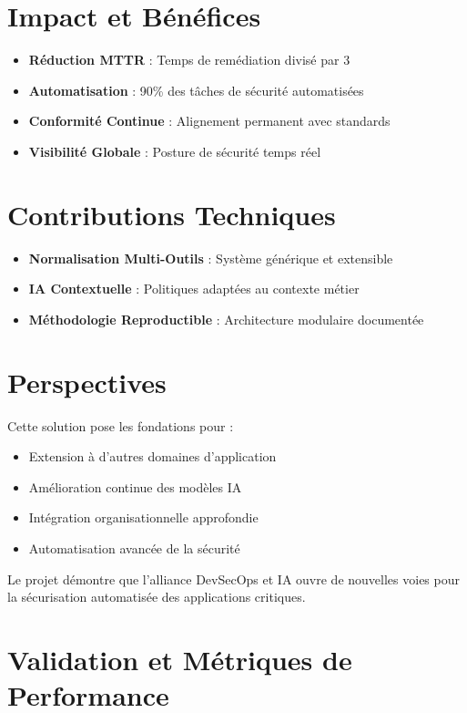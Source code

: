 \documentclass[12pt,a4paper]{report}
\begin{document}
\section{Impact et Bénéfices}

\begin{itemize}
    \item \textbf{Réduction MTTR} : Temps de remédiation divisé par 3
    \item \textbf{Automatisation} : 90\% des tâches de sécurité automatisées
    \item \textbf{Conformité Continue} : Alignement permanent avec standards
    \item \textbf{Visibilité Globale} : Posture de sécurité temps réel
\end{itemize}

\section{Contributions Techniques}

\begin{itemize}
    \item \textbf{Normalisation Multi-Outils} : Système générique et extensible
    \item \textbf{IA Contextuelle} : Politiques adaptées au contexte métier
    \item \textbf{Méthodologie Reproductible} : Architecture modulaire documentée
\end{itemize}

\section{Perspectives}

Cette solution pose les fondations pour :
\begin{itemize}
    \item Extension à d'autres domaines d'application
    \item Amélioration continue des modèles IA
    \item Intégration organisationnelle approfondie
    \item Automatisation avancée de la sécurité
\end{itemize}

Le projet démontre que l'alliance DevSecOps et IA ouvre de nouvelles voies pour la sécurisation automatisée des applications critiques.

\section{Validation et Métriques de Performance}
\end{document}
